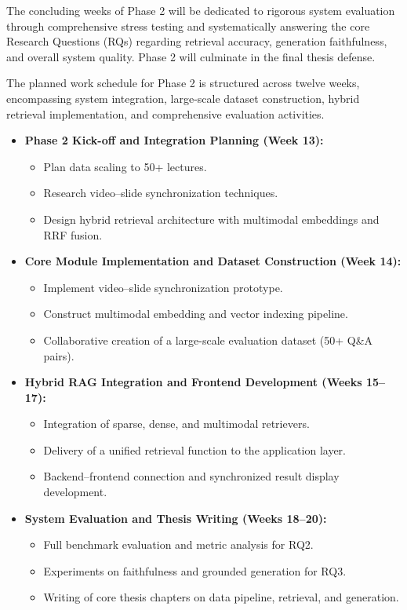 The concluding weeks of Phase 2 will be dedicated to rigorous system evaluation through comprehensive stress testing and systematically answering the core Research Questions (RQs) regarding retrieval accuracy, generation faithfulness, and overall system quality. Phase 2 will culminate in the final thesis defense.

The planned work schedule for Phase 2 is structured across twelve weeks, encompassing system integration, large-scale dataset construction, hybrid retrieval implementation, and comprehensive evaluation activities.

\begin{itemize}
    \item \textbf{Phase 2 Kick-off and Integration Planning (Week 13):}
    \begin{itemize}
        \item Plan data scaling to 50+ lectures.
        \item Research video--slide synchronization techniques.
        \item Design hybrid retrieval architecture with multimodal embeddings and RRF fusion.
    \end{itemize}

    \item \textbf{Core Module Implementation and Dataset Construction (Week 14):}
    \begin{itemize}
        \item Implement video--slide synchronization prototype.
        \item Construct multimodal embedding and vector indexing pipeline.
        \item Collaborative creation of a large-scale evaluation dataset (50+ Q\&A pairs).
    \end{itemize}

    \item \textbf{Hybrid RAG Integration and Frontend Development (Weeks 15--17):}
    \begin{itemize}
        \item Integration of sparse, dense, and multimodal retrievers.
        \item Delivery of a unified retrieval function to the application layer.
        \item Backend--frontend connection and synchronized result display development.
    \end{itemize}

    \item \textbf{System Evaluation and Thesis Writing (Weeks 18--20):}
    \begin{itemize}
        \item Full benchmark evaluation and metric analysis for RQ2.
        \item Experiments on faithfulness and grounded generation for RQ3.
        \item Writing of core thesis chapters on data pipeline, retrieval, and generation.
    \end{itemize}


\end{itemize}
